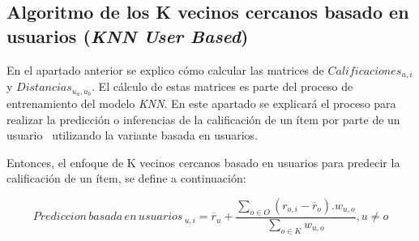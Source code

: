 \documentclass[11pt,a4paper,twoside]{thesis}
\begin{document}
\clearpage

\subsection{
	Algoritmo de los K vecinos cercanos basado en usuarios
	(\textit{KNN User Based})
}

En el apartado anterior se explico cómo calcular las matrices de
$Calificaciones_{u,i}$ y $Distancias_{u_a,u_b}$. El cálculo de estas matrices
es parte del proceso de entrenamiento del modelo \textit{KNN}. En este apartado
se explicará el proceso para realizar la predicción o inferencias de la
calificación de un ítem por parte de un usuario~\cite{useritembasedinference}
utilizando la variante basada en usuarios.

Entonces, el enfoque de K vecinos cercanos basado en usuarios para predecir la
calificación de un ítem, se define a continuación:

\begin{equation}
	Prediccion \mspace{3mu}basada \mspace{3mu}en \mspace{3mu}usuarios\mspace{3mu}_{u, i} = \overline{r}_{u} + \frac{\sum_{o \in O} (r_{o, i} - \overline{r}_o) . w_{u, o} }{ \sum_{o \in K} w_{u, o}}, u \neq o
\end{equation}
\end{document}
